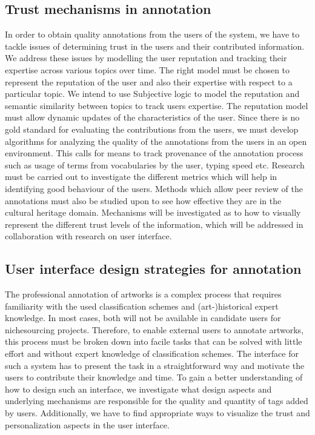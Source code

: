\subsection{Trust mechanisms in annotation}
\label{trust}
In order to obtain quality annotations from the users of the system, we have to tackle issues of determining trust in the users and their contributed information. We address these issues by modelling the user reputation and tracking their expertise across various topics over time. The right model must be chosen to represent the reputation of the user and also their expertise with respect to a particular topic. We intend to use Subjective logic to model the reputation and semantic similarity between topics to track users expertise. The reputation model must allow dynamic updates of the characteristics of the user. Since there is no gold standard for evaluating the contributions from the users, we must develop algorithms for analyzing the quality of the annotations from the users in an open environment. This calls for means to track provenance of the annotation process such as usage of terms from vocabularies by the user, typing speed etc. Research must be carried out to investigate the different metrics which will help in identifying good behaviour of the users. Methods which allow peer review of the annotations must also be studied upon to see how effective they are in the cultural heritage domain. Mechanisms will be investigated as to how to visually represent the different trust levels of the information, which will be addressed in collaboration with research on user interface.

\subsection{User interface design strategies for annotation}
\label{UI}
The professional annotation of artworks is a complex process that requires familiarity with the used classification schemes and (art-)historical expert knowledge. In most cases, both will not be available in candidate users for nichesourcing projects. Therefore, to enable external users to annotate artworks, this process must be broken down into facile tasks that can be solved with little effort and without expert knowledge of classification schemes.
The interface for such a system has to present the task in a straightforward way and motivate the users to contribute their knowledge and time.
To gain a better understanding of how to design such an interface, we investigate what design aspects and underlying mechanisms are responsible for the quality and quantity of tags added by users.
Additionally, we have to find appropriate ways to visualize the trust and personalization aspects in the user interface.
